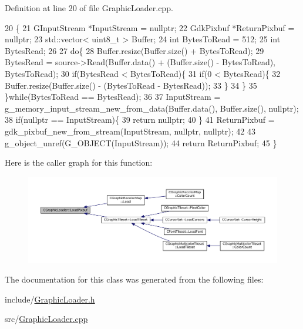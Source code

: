 Definition at line 20 of file Graphic\+Loader.\+cpp.


\begin{DoxyCode}
20                                                                         \{
21     GInputStream *InputStream = \textcolor{keyword}{nullptr};
22     GdkPixbuf *ReturnPixbuf = \textcolor{keyword}{nullptr};
23     std::vector< uint8\_t > Buffer;
24     \textcolor{keywordtype}{int} BytesToRead = 512;
25     \textcolor{keywordtype}{int} BytesRead;
26     
27     \textcolor{keywordflow}{do}\{
28         Buffer.resize(Buffer.size() + BytesToRead);
29         BytesRead = source->Read(Buffer.data() + (Buffer.size() - BytesToRead), BytesToRead);
30         \textcolor{keywordflow}{if}(BytesRead < BytesToRead)\{
31             \textcolor{keywordflow}{if}(0 < BytesRead)\{
32                 Buffer.resize(Buffer.size() - (BytesToRead - BytesRead));
33             \}
34         \}
35     \}\textcolor{keywordflow}{while}(BytesToRead == BytesRead);
36     
37     InputStream = g\_memory\_input\_stream\_new\_from\_data(Buffer.data(), Buffer.size(), \textcolor{keyword}{nullptr});
38     \textcolor{keywordflow}{if}(\textcolor{keyword}{nullptr} == InputStream)\{
39         \textcolor{keywordflow}{return} \textcolor{keyword}{nullptr};   
40     \}
41     ReturnPixbuf = gdk\_pixbuf\_new\_from\_stream(InputStream, \textcolor{keyword}{nullptr}, \textcolor{keyword}{nullptr}); 
42     
43     g\_object\_unref(G\_OBJECT(InputStream));
44     \textcolor{keywordflow}{return} ReturnPixbuf;
45 \}
\end{DoxyCode}
Here is the caller graph for this function\+:\nopagebreak
\begin{figure}[H]
\begin{center}
\leavevmode
\includegraphics[width=350pt]{classCGraphicLoader_ac7778dec4fd0ea51674f0b23f3029edf_icgraph}
\end{center}
\end{figure}


The documentation for this class was generated from the following files\+:\begin{DoxyCompactItemize}
\item 
include/\hyperlink{GraphicLoader_8h}{Graphic\+Loader.\+h}\item 
src/\hyperlink{GraphicLoader_8cpp}{Graphic\+Loader.\+cpp}\end{DoxyCompactItemize}
